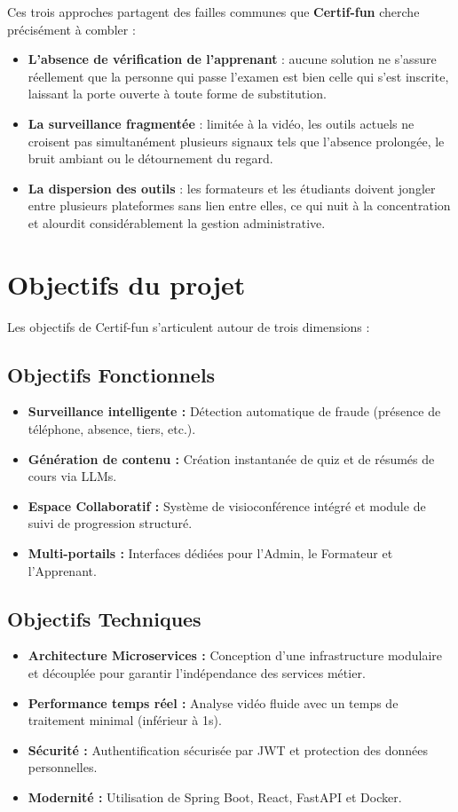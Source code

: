 Ces trois approches partagent des failles communes que \textbf{Certif-fun} cherche précisément à combler :
\begin{itemize}
    \item \textbf{L'absence de vérification de l'apprenant} : aucune solution ne s'assure réellement que la personne qui passe l'examen est bien celle qui s'est inscrite, laissant la porte ouverte à toute forme de substitution.
    \item \textbf{La surveillance fragmentée} : limitée à la vidéo, les outils actuels ne croisent pas simultanément plusieurs signaux tels que l'absence prolongée, le bruit ambiant ou le détournement du regard.
    \item \textbf{La dispersion des outils} : les formateurs et les étudiants doivent jongler entre plusieurs plateformes sans lien entre elles, ce qui nuit à la concentration et alourdit considérablement la gestion administrative.
\end{itemize}

\section{Objectifs du projet}
Les objectifs de Certif-fun s'articulent autour de trois dimensions :

\subsection{Objectifs Fonctionnels}
\begin{itemize}
    \item \textbf{Surveillance intelligente :} Détection automatique de fraude (présence de téléphone, absence, tiers, etc.).
    \item \textbf{Génération de contenu :} Création instantanée de quiz et de résumés de cours via LLMs.
    \item \textbf{Espace Collaboratif :} Système de visioconférence intégré et module de suivi de progression structuré.
    \item \textbf{Multi-portails :} Interfaces dédiées pour l'Admin, le Formateur et l'Apprenant.
\end{itemize}

\subsection{Objectifs Techniques}
\begin{itemize}
    \item \textbf{Architecture Microservices :} Conception d'une infrastructure modulaire et découplée pour garantir l'indépendance des services métier.
    \item \textbf{Performance temps réel :} Analyse vidéo fluide avec un temps de traitement minimal (inférieur à 1s).
    \item \textbf{Sécurité :} Authentification sécurisée par JWT et protection des données personnelles.
    \item \textbf{Modernité :} Utilisation de Spring Boot, React, FastAPI et Docker.
\end{itemize}

